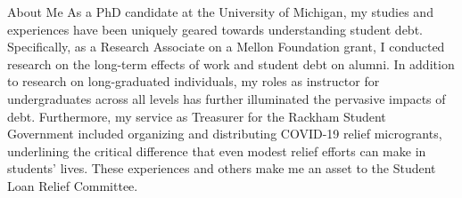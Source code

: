 
\begin{rubric}{About Me}
	\entry*[]%
	As a PhD candidate at the University of Michigan, my studies and experiences have been uniquely geared towards understanding student debt. Specifically, as a Research Associate on a Mellon Foundation grant, I conducted research on the long-term effects of work and student debt on alumni. In addition to research on long-graduated individuals, my roles as instructor for undergraduates across all levels has further illuminated the pervasive impacts of debt. Furthermore, my service as Treasurer for the Rackham Student Government included organizing and distributing COVID-19 relief microgrants, underlining the critical difference that even modest relief efforts can make in students' lives. These experiences and others make me an asset to the Student Loan Relief Committee.
	\end{rubric}